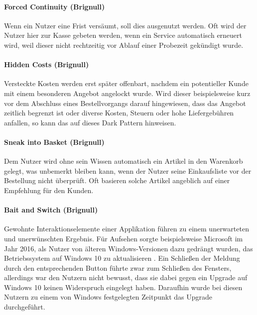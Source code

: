 \documentclass[a4paper]{article}
\begin{document}
\paragraph{Forced Continuity (Brignull)}
\label{para:forced_continuity}
Wenn ein Nutzer eine Frist versäumt, soll dies ausgenutzt werden. Oft wird der Nutzer hier zur Kasse gebeten werden, wenn ein Service automatisch erneuert wird, weil dieser nicht rechtzeitig vor Ablauf einer Probezeit gekündigt wurde.

\paragraph{Hidden Costs (Brignull)} 
\label{para:hidden_costs}
Versteckte Kosten werden erst später offenbart, nachdem ein potentieller Kunde mit einem besonderen Angebot angelockt wurde. Wird dieser beispielsweise kurz vor dem Abschluss eines Bestellvorgangs darauf hingewiesen, dass das Angebot zeitlich begrenzt ist oder diverse Kosten, Steuern oder hohe Liefergebühren anfallen, so kann das auf dieses Dark Pattern hinweisen. 

\paragraph{Sneak into Basket (Brignull)}
\label{para:sneak_into_basket}
Dem Nutzer wird ohne sein Wissen automatisch ein Artikel in den Warenkorb gelegt, was unbemerkt bleiben kann, wenn der Nutzer seine Einkaufsliste vor der Bestellung nicht überprüft. Oft basieren solche Artikel angeblich auf einer Empfehlung für den Kunden.

\paragraph{Bait and Switch (Brignull)}
\label{para:bait_and_switch}
Gewohnte Interaktionselemente einer Applikation führen zu einem unerwarteten und unerwünschten Ergebnis. 
Für Aufsehen sorgte beispielsweise Microsoft im Jahr 2016, als Nutzer von älteren Windows-Versionen dazu gedrängt wurden, das Betriebssystem auf Windows 10 zu aktualisieren \cite{thurrott}. Ein Schließen der Meldung durch den entsprechenden Button führte zwar zum Schließen des Fensters, allerdings war den Nutzern nicht bewusst, dass sie dabei gegen ein Upgrade auf Windows 10 keinen Widerspruch eingelegt haben. Daraufhin wurde bei diesen Nutzern zu einem von Windows festgelegten Zeitpunkt das Upgrade durchgeführt. 
\end{document}
